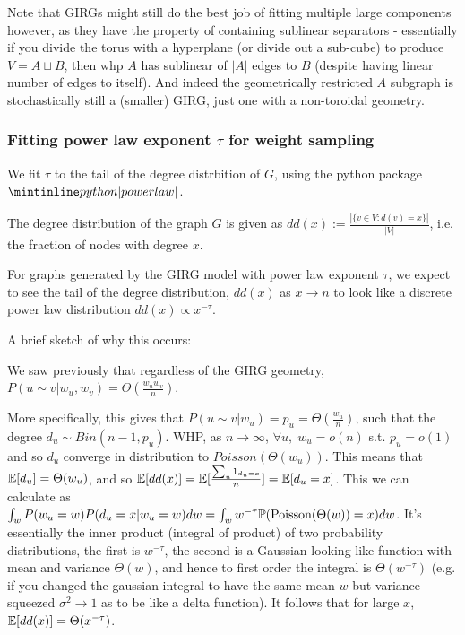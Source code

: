 Note that GIRGs might still do the best job of fitting multiple large components however, as they have the property of containing sublinear separators - essentially if you divide the torus with a hyperplane (or divide out a sub-cube) to produce $V = A \sqcup B$, then whp $A$ has sublinear of $|A|$ edges to $B$ (despite having linear number of edges to itself). And indeed the geometrically restricted $A$ subgraph is stochastically still a (smaller) GIRG, just one with a non-toroidal geometry.








\subsubsection{Fitting power law exponent $\tau$ for weight sampling}
We fit $\tau$ to the tail of the degree distrbition of $G$, using the python package $\PLP$.

The degree distribution of the graph $G$ is given as $dd(x) := \frac{|\{v \in V: d(v) = x\}|}{|V|}$, i.e. the fraction of nodes with degree $x$.

For graphs generated by the GIRG model with power law exponent $\tau$, we expect to see the tail of the degree distribution, $dd(x)$ as $x \to n$ to look like a discrete power law distribution $dd(x) \propto x^{-\tau}$.

A brief sketch of why this occurs:

We saw previously that regardless of the GIRG geometry, $P(u \sim v | w_u, w_v) = \Theta(\frac{w_u w_v}{n})$.

More specifically, this gives that $P(u \sim v | w_u) = p_u = \Theta(\frac{w_u}{n})$, such that the degree $d_u \sim Bin(n-1, p_u)$.
WHP, as $n \to \infty$, $\forall u,\; w_u = o(n)$ s.t. $p_u = o(1)$ and so $d_u$ converge in distribution to $Poisson(\Theta(w_u))$.
This means that $\mathbb{E}[d_u] = \Theta(w_u)$, and so $\mathbb{E}[dd(x)] = \mathbb{E}[ \frac{ \sum_u 1_{d_u = x}}{n}] = \mathbb{E}[d_u = x]$. This we can calculate as $\int_w P(w_u = w) P(d_u = x | w_u = w)dw = \int_w w^{-\tau} \mathbb{P}(\operatorname{Poisson}(\Theta(w)) = x) dw$. It's essentially the inner product (integral of product) of two probability distributions, the first is $w^{-\tau}$, the second is a Gaussian looking like function with mean and variance $\Theta(w)$, and hence to first order the integral is $\Theta(w^{-\tau})$ (e.g. if you changed the gaussian integral to have the same mean $w$ but variance squeezed $\sigma^2 \to 1$ as to be like a delta function). It follows that for large $x$, $\mathbb{E}[dd(x)] = \Theta(x^{-\tau})$.

